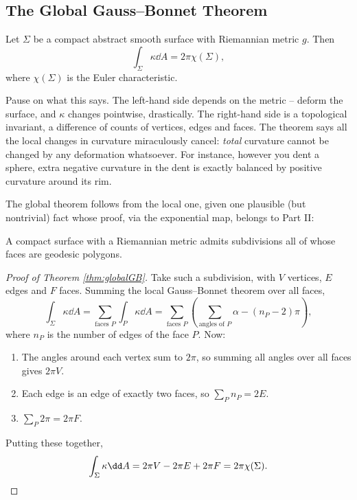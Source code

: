 \subsection{The Global Gauss--Bonnet Theorem}

\begin{theorem}\label{thm:globalGB}
    Let $\Sigma$ be a compact abstract smooth surface with Riemannian metric $g$. Then
    $$
    \int_\Sigma \kappa \dd A = 2 \pi \chi(\Sigma),
    $$
    where $\chi(\Sigma)$ is the Euler characteristic.
\end{theorem}

Pause on what this says. The left-hand side depends on the metric -- deform the surface, and $\kappa$ changes pointwise, drastically. The right-hand side is a topological invariant, a difference of counts of vertices, edges and faces. The theorem says all the local changes in curvature miraculously cancel: \emph{total} curvature cannot be changed by any deformation whatsoever. For instance, however you dent a sphere, extra negative curvature in the dent is exactly balanced by positive curvature around its rim.

The global theorem follows from the local one, given one plausible (but nontrivial) fact whose proof, via the exponential map, belongs to Part II:

\begin{lemma}
    A compact surface with a Riemannian metric admits subdivisions all of whose faces are geodesic polygons.
\end{lemma}

\begin{proof}[Proof of Theorem \ref{thm:globalGB}]
    Take such a subdivision, with $V$ vertices, $E$ edges and $F$ faces. Summing the local Gauss--Bonnet theorem over all faces,
    $$
    \int_\Sigma \kappa \dd A = \sum_{\text{faces } P} \int_P \kappa \dd A = \sum_{\text{faces } P} \left(\sum_{\text{angles of } P} \alpha - (n_P - 2)\pi\right),
    $$
    where $n_P$ is the number of edges of the face $P$. Now:
    \begin{enumerate}[label=(\roman*)]
        \item The angles around each vertex sum to $2\pi$, so summing all angles over all faces gives $2\pi V$.
        \item Each edge is an edge of exactly two faces, so $\sum_P n_P = 2E$.
        \item $\sum_P 2\pi = 2\pi F$.
    \end{enumerate}
    Putting these together,
    $$
    \int_\Sigma \kappa \dd A = 2\pi V - 2\pi E + 2\pi F = 2\pi \chi(\Sigma). \qedhere
    $$
\end{proof}

